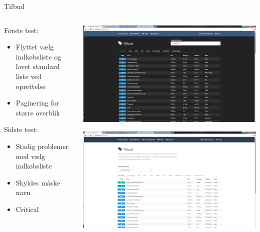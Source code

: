 \begin{frame}{Tilbud}
	
	\begin{minipage}[0.3\textheight]{\textwidth}
	\begin{columns}[T]
	\begin{column}{0.5\textwidth}
	
	Første test:
	\begin{itemize}
	\item Flyttet vælg indkøbsliste og lavet standard liste ved oprettelse
	\item Paginering for større overblik	
	\end{itemize}
	Sidste test:
	\begin{itemize}
		\item Stadig problemer med vælg indkøbsliste
		\item Skyldes måske navn
		\item Critical
	\end{itemize}
	\end{column}
	\begin{column}{0.5\textwidth}
	 \includegraphics[width=1\textwidth,height=1\textheight,keepaspectratio, trim={1cm 0 0 16mm}, clip]{images/Screenshots/OffersOld.png}
	 
	 \vspace{2 mm}
	  
	  \includegraphics[width=1\textwidth,height=1\textheight,keepaspectratio, trim={1cm 0 0 16mm}, clip]{images/Screenshots/Offers.png}
	\end{column}
	\end{columns}
	

  \end{minipage}
  
  	
\end{frame}

